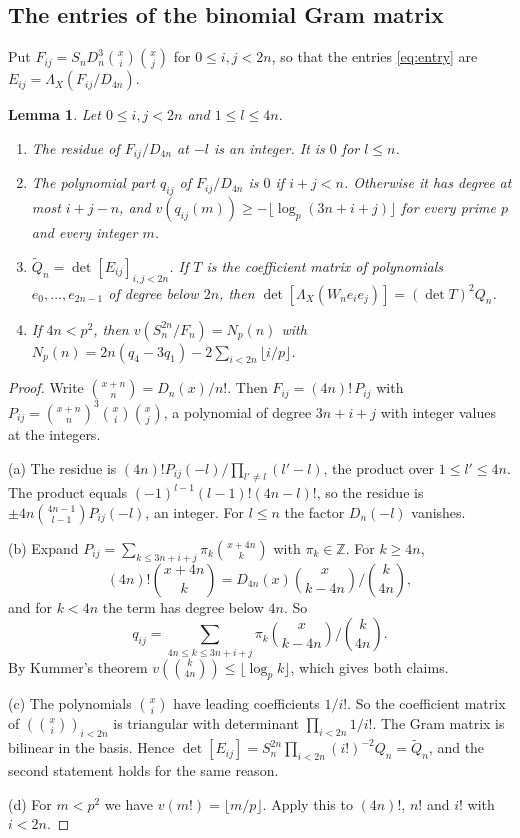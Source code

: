 \documentclass[11pt]{amsart}
\newtheorem{lemma}[theorem]{Lemma}
\theoremstyle{definition}
\theoremstyle{remark}
\numberwithin{equation}{section}
\newcommand{\Z}{\mathbb Z}
\begin{document}
\subsection{The entries of the binomial Gram matrix}
Put $F_{ij}=S_nD_n^3\binom xi\binom xj$ for $0\le i,j<2n$, so that the entries \eqref{eq:entry} are
$E_{ij}=\Lambda_X(F_{ij}/D_{4n})$.

\begin{lemma}\label{tp:lem:gram}
Let $0\le i,j<2n$ and $1\le l\le4n$.
\begin{enumerate}[label=(\alph*)]
\item The residue of $F_{ij}/D_{4n}$ at $-l$ is an integer. It is $0$ for $l\le n$.
\item The polynomial part $q_{ij}$ of $F_{ij}/D_{4n}$ is $0$ if $i+j<n$. Otherwise it has degree at most $i+j-n$, and
 $v(q_{ij}(m))\ge-\lfloor\log_p(3n+i+j)\rfloor$ for every prime $p$ and every integer $m$.
\item $\tilde Q_n=\det[E_{ij}]_{i,j<2n}$. If $T$ is the coefficient matrix of polynomials $e_0,\dots,e_{2n-1}$ of degree
 below $2n$, then $\det[\Lambda_X(W_ne_ie_j)]=(\det T)^2Q_n$.
\item If $4n<p^2$, then $v(S_n^{2n}/F_n)=N_p(n)$ with
 $N_p(n)=2n(q_4-3q_1)-2\sum_{i<2n}\lfloor i/p\rfloor$.
\end{enumerate}
\end{lemma}

\begin{proof}
Write $\binom{x+n}n=D_n(x)/n!$. Then $F_{ij}=(4n)!\,P_{ij}$ with $P_{ij}=\binom{x+n}n^3\binom xi\binom xj$, a polynomial
of degree $3n+i+j$ with integer values at the integers.

(a) The residue is $(4n)!P_{ij}(-l)/\prod_{l'\ne l}(l'-l)$, the product over $1\le l'\le4n$. The product equals
$(-1)^{l-1}(l-1)!(4n-l)!$, so the residue is $\pm4n\binom{4n-1}{l-1}P_{ij}(-l)$, an integer. For $l\le n$ the factor
$D_n(-l)$ vanishes.

(b) Expand $P_{ij}=\sum_{k\le3n+i+j}\pi_k\binom{x+4n}k$ with $\pi_k\in\Z$. For $k\ge4n$,
\[
 (4n)!\binom{x+4n}k=D_{4n}(x)\binom x{k-4n}\Big/\binom k{4n},
\]
and for $k<4n$ the term has degree below $4n$. So
\[
 q_{ij}=\sum_{4n\le k\le3n+i+j}\pi_k\binom x{k-4n}\Big/\binom k{4n}.
\]
By Kummer's theorem $v(\binom k{4n})\le\lfloor\log_pk\rfloor$, which gives both claims.

(c) The polynomials $\binom xi$ have leading coefficients $1/i!$. So the coefficient matrix of $(\binom xi)_{i<2n}$ is
triangular with determinant $\prod_{i<2n}1/i!$. The Gram matrix is bilinear in the basis. Hence
$\det[E_{ij}]=S_n^{2n}\prod_{i<2n}(i!)^{-2}Q_n=\tilde Q_n$, and the second statement holds for the same reason.

(d) For $m<p^2$ we have $v(m!)=\lfloor m/p\rfloor$. Apply this to $(4n)!$, $n!$ and $i!$ with $i<2n$.
\end{proof}
\end{document}
